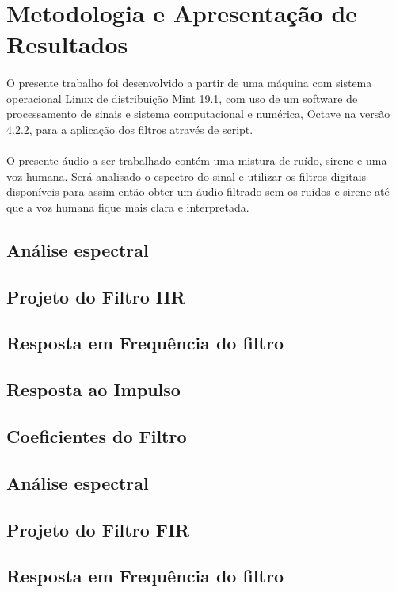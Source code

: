 \documentclass[12pt,fleqn]{article}
\begin{document}
\section{Metodologia e Apresentação de Resultados}
\paragraph{} O presente trabalho foi desenvolvido a partir de uma máquina com sistema operacional Linux de distribuição Mint 19.1, com uso de um software de processamento de sinais e sistema computacional e numérica, Octave na versão 4.2.2, para a aplicação dos filtros através de script.
\paragraph{} O presente áudio a ser trabalhado contém uma mistura de ruído, sirene e uma voz humana. Será analisado o espectro do sinal e utilizar os filtros digitais disponíveis para assim então obter um áudio filtrado sem os ruídos e sirene até que a voz humana fique mais clara e interpretada.

\subsection{Análise espectral}
\subsection{Projeto do Filtro IIR}
\subsection{Resposta em Frequência do filtro}
\subsection{Resposta ao Impulso}
\subsection{Coeficientes do Filtro}

\subsection{Análise espectral}
\subsection{Projeto do Filtro FIR}
\subsection{Resposta em Frequência do filtro}
\end{document}
